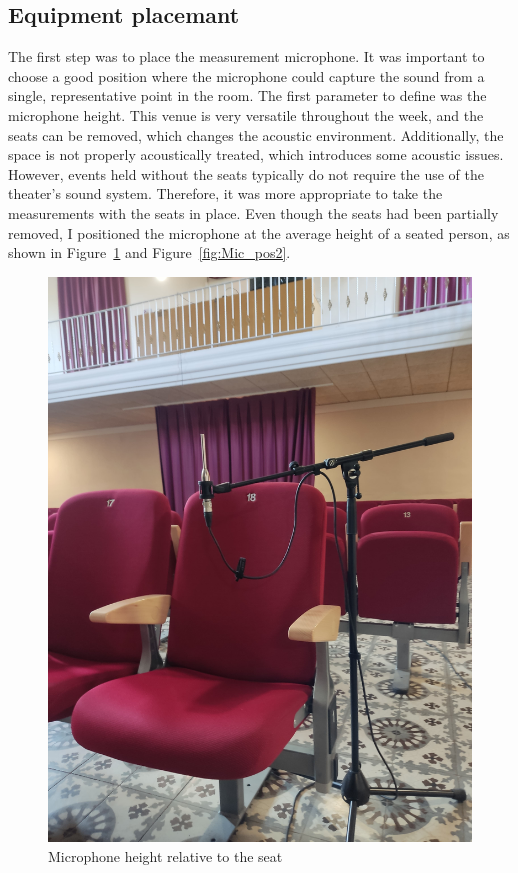 \subsection{Equipment placemant}

The first step was to place the measurement microphone. It was important to choose a good position where the microphone could capture the sound from a single, representative point in the room. The first parameter to define was the microphone height. This venue is very versatile throughout the week, and the seats can be removed, which changes the acoustic environment. Additionally, the space is not properly acoustically treated, which introduces some acoustic issues. However, events held without the seats typically do not require the use of the theater's sound system. Therefore, it was more appropriate to take the measurements with the seats in place. Even though the seats had been partially removed, I positioned the microphone at the average height of a seated person, as shown in Figure~\ref{fig:Mic_pos1} and Figure~\ref{fig:Mic_pos2}.

\begin{figure}[H]
	\centering
	\includegraphics[width=0.6
	\linewidth]{Figures/Coro_micpos1.jpeg}
	\caption{Microphone height relative to the seat}
	\label{fig:Mic_pos1}
\end{figure}

